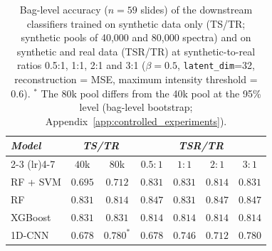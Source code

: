 \begin{table}[H]
\centering
\small
\caption{Bag-level accuracy ($n=59$ slides) of the downstream classifiers trained on synthetic data only (TS/TR; synthetic pools of 40,000 and 80,000 spectra) and on synthetic and real data (TSR/TR) at synthetic-to-real ratios 0.5:1, 1:1, 2:1 and 3:1 ($\beta=0.5$, \texttt{latent\_dim}=32, reconstruction = MSE, maximum intensity threshold = 0.6). $^{*}$ The 80k pool differs from the 40k pool at the 95\% level (bag-level bootstrap; Appendix~\ref{app:controlled_experiments}).}
\label{tab:synth_ratio_results}
\begin{tabular*}{\textwidth}{@{\extracolsep{\fill}}lcccccc}
\toprule
\multirow{2}{*}{\emph{Model}} & \multicolumn{2}{c}{\emph{TS/TR}} & \multicolumn{4}{c}{\emph{TSR/TR}} \\
\cmidrule(lr){2-3} \cmidrule(lr){4-7}
 & $40$k & $80$k & $0.5{:}1$ & $1{:}1$ & $2{:}1$ & $3{:}1$ \\
\midrule
RF + SVM & $0.695$ & $0.712$ & $0.831$ & $0.831$ & $0.814$ & $0.831$ \\
RF & $0.831$ & $0.814$ & $0.847$ & $0.831$ & $0.847$ & $0.847$ \\
XGBoost & $0.831$ & $0.831$ & $0.814$ & $0.814$ & $0.814$ & $0.814$ \\
1D-CNN & $0.678$ & $0.780^{*}$ & $0.678$ & $0.746$ & $0.712$ & $0.780$ \\
\bottomrule
\end{tabular*}
\end{table}
